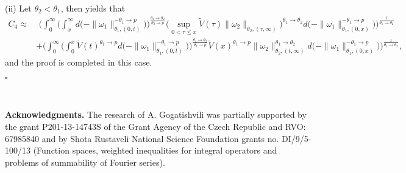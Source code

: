 \documentclass[11pt]{amsart}
\theoremstyle{plain}
\theoremstyle{definition}
\numberwithin{thm}{section}
\numberwithin{equation}{section}
\begin{document}
{\rm (ii)} Let  ${\theta}_2 < {\theta}_1$, then \cite[Theorem 4.4]{gop} yields that
\begin{align*}
C_4  {\approx} & \,\, \bigg(\int_0^{\infty} \bigg(\int_x^{\infty} d\bigg(- \|{\omega}_1\|_{{\theta}_1,(0,t)}^{-{\theta}_1{\rightarrow} p}\bigg)\bigg)^{\frac{{\theta}_1{\rightarrow} {\theta}_2}{{\theta}_2 {\rightarrow} p}} \bigg(\sup_{0 < \tau \leq x} \widetilde V(\tau) \|{\omega}_2\|_{{\theta}_2,(\tau,\infty)}\bigg)^{{\theta}_1 {\rightarrow} {\theta}_2} d\bigg(-\|{\omega}_1\|_{{\theta}_1,(0,x)}^{-{\theta}_1 {\rightarrow} p}\bigg)\bigg)^{\frac{1}{{\theta}_1 {\rightarrow} {\theta}_2}} \\
& + \bigg(\int_0^{\infty} \bigg(\int_0^x \widetilde V(t)^{{\theta}_1{\rightarrow} p} d\bigg(-\|{\omega}_1\|_{{\theta}_1,(0,t)}^{-{\theta}_1{\rightarrow} p} \bigg) \bigg)^{\frac{{\theta}_1{\rightarrow} {\theta}_2}{{\theta}_2{\rightarrow} p}} \widetilde{V}(x)^{{\theta}_1{\rightarrow} p} \|{\omega}_2\|_{{\theta}_2,(t,\infty)}^{{\theta}_1{\rightarrow} {\theta}_2} d\bigg(-\|{\omega}_1\|_{{\theta}_1,(0,x)}^{-{\theta}_1{\rightarrow} p} \bigg)\bigg)^{\frac{1}{{\theta}_1{\rightarrow} {\theta}_2}},
\end{align*}
and the proof is completed in this case.

\hspace{16.9cm}$\square$

\

{\bf Acknowledgments.} The research of A. Gogatishvili was partially supported by the grant P201-13-14743S of the Grant Agency of the Czech Republic and RVO: 67985840 and  by Shota Rustaveli National Science Foundation grants no. DI/9/5-100/13 (Function spaces, weighted inequalities for integral operators and problems of summability of Fourier series).
\end{document}
